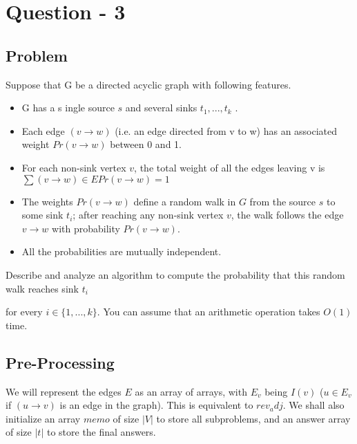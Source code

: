\documentclass{article}
\begin{document}
\section{Question - 3}

\subsection{Problem}

Suppose that G be a directed acyclic graph with following features.

\begin{itemize}

\item G has a s  ingle source $s$ and several sinks $t_1,...,t_k$
.
\item Each edge $(v \rightarrow w)$ (i.e. an edge directed from v to w) has an associated weight $Pr(v \rightarrow w)$
between 0 and 1.

\item For each non-sink vertex $v$, the total weight of all the edges leaving v is
$\sum (v \rightarrow w) \in E Pr(v \rightarrow w) = 1$

\item The weights $Pr(v \rightarrow w)$ define a random walk in $G$ from the source $s$ to some sink $t_i$; after
reaching any non-sink vertex $v$, the walk follows the edge $v \rightarrow w$ with probability $Pr(v \rightarrow w)$.

\item All the probabilities are mutually independent.

\end{itemize}

Describe and analyze an algorithm to compute the
probability that this random walk reaches sink $t_i$

for every $i \in \{1,...,k\}$. You can assume that an arithmetic operation takes $O(1)$ time.

\subsection{Pre-Processing}

We will represent the edges $E$ as an array of arrays, with $E_v$ being $I(v)$ ($u \in E_v$ if $(u\rightarrow v)$ is an edge in the graph). This is equivalent to $rev_adj$. We shall also initialize an array $memo$ of size $|V|$ to store all subproblems, and an answer array of size $|t|$ to store the final answers.
\end{document}
